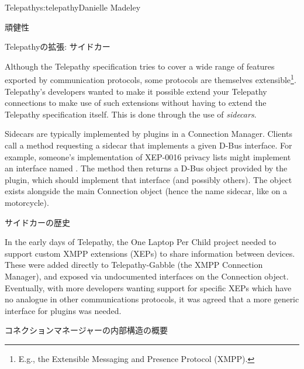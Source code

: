 \begin{aosachapter}{Telepathy}{s:telepathy}{Danielle Madeley}
\begin{aosasect1}{頑健性}
\begin{aosaitemize}
\end{aosaitemize}

\end{aosasect1}

\begin{aosasect1}{Telepathyの拡張: サイドカー}

Although the Telepathy specification tries to cover a wide range of
features exported by communication protocols, some protocols are
themselves extensible\footnote{E.g., the Extensible Messaging and
 Presence Protocol (XMPP).}.  Telepathy's developers wanted to make
it possible extend your Telepathy connections to make use of such
extensions without having to extend the Telepathy specification
itself. This is done through the use of \emph{sidecars}.

Sidecars are typically implemented by plugins in a Connection Manager.
Clients call a method requesting a sidecar that implements a given
D-Bus interface.  For example, someone's implementation of XEP-0016
privacy lists might implement an interface named
. The method then returns a D-Bus
object provided by the plugin, which should implement that interface
(and possibly others). The object exists alongside the main Connection
object (hence the name sidecar, like on a motorcycle).

\begin{aosabox}{サイドカーの歴史}

In the early days of Telepathy, the One Laptop Per Child project
needed to support custom XMPP extensions (XEPs) to share information
between devices. These were added directly to Telepathy-Gabble (the
XMPP Connection Manager), and exposed via undocumented interfaces on
the Connection object.  Eventually, with more developers wanting
support for specific XEPs which have no analogue in other
communications protocols, it was agreed that a more generic interface
for plugins was needed.

\end{aosabox}

\end{aosasect1}

\begin{aosasect1}{コネクションマネージャーの内部構造の概要}


\end{aosasect1}
\end{aosachapter}

